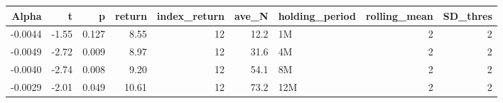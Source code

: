 \begin{table}[ht]
\centering
\begin{tabular}{rrrrrrlrr}
  \hline
Alpha & t & p & return & index\_return & ave\_N & holding\_period & rolling\_mean & SD\_thres \\ 
  \hline
-0.0044 & -1.55 & 0.127 & 8.55 & 12 & 12.2 & 1M &  2 &  2 \\ 
  -0.0049 & -2.72 & 0.009 & 8.97 & 12 & 31.6 & 4M &  2 &  2 \\ 
  -0.0040 & -2.74 & 0.008 & 9.20 & 12 & 54.1 & 8M &  2 &  2 \\ 
  -0.0029 & -2.01 & 0.049 & 10.61 & 12 & 73.2 & 12M &  2 &  2 \\ 
   \hline
\end{tabular}
\end{table}

